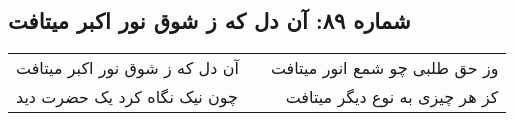 \begin{center}
\section*{شماره ۸۹: آن دل که ز شوق نور اکبر میتافت}
\label{sec:089}
\begin{longtable}{l p{0.5cm} r}
آن دل که ز شوق نور اکبر میتافت
&&
وز حق طلبی چو شمع انور میتافت
\\
چون نیک نگاه کرد یک حضرت دید
&&
کز هر چیزی به نوع دیگر میتافت
\\
\end{longtable}
\end{center}

